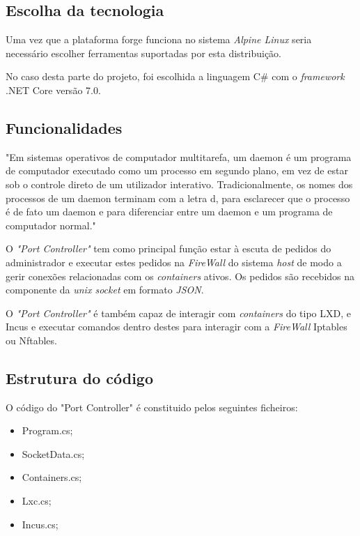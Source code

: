 \subsection{Escolha da tecnologia}

Uma vez que a plataforma forge funciona no sistema \textit{Alpine Linux} seria
necessário escolher ferramentas suportadas por esta distribuição.

No caso desta parte do projeto, foi escolhida a linguagem C\# com o 
\textit{framework} .NET Core versão 7.0.



\subsection{Funcionalidades}

"Em sistemas operativos de computador multitarefa, um daemon é um programa de 
computador executado como um processo em segundo plano, em vez de estar sob o 
controle direto de um utilizador interativo. Tradicionalmente, os nomes dos processos
de um daemon terminam com a letra d, para esclarecer que o processo é de fato um 
daemon e para diferenciar entre um daemon e um programa de computador normal." \cite{daemon}


O \textit{"Port Controller"} tem como principal função estar à escuta de pedidos
do administrador e executar estes pedidos na \textit{FireWall} do sistema
\textit{host} de modo a gerir conexões relacionadas com os \textit{containers}
ativos. Os pedidos são recebidos na componente da \textit{unix socket} em formato
\textit{JSON}.


O \textit{"Port Controller"} é também capaz de interagir com \textit{containers}
do tipo LXD, e Incus e executar comandos dentro destes para interagir com a
\textit{FireWall} Iptables ou Nftables.

\subsection{Estrutura do código}

O código do "Port Controller" é constituido pelos seguintes ficheiros:

\begin{itemize}
    \item Program.cs;
    \item SocketData.cs;
    \item Containers.cs;
    \item Lxc.cs;
    \item Incus.cs;
\end{itemize}

